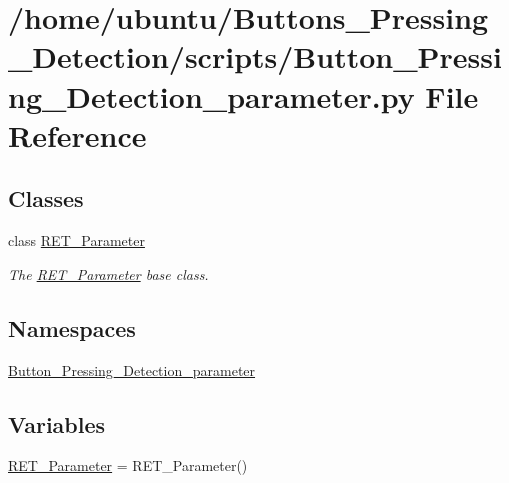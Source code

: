 \hypertarget{a00008}{}\section{/home/ubuntu/\+Buttons\+\_\+\+Pressing\+\_\+\+Detection/scripts/\+Button\+\_\+\+Pressing\+\_\+\+Detection\+\_\+parameter.py File Reference}
\label{a00008}
\subsection*{Classes}
\begin{DoxyCompactItemize}
\item 
class \hyperlink{a00037}{R\+E\+T\+\_\+\+Parameter}
\begin{DoxyCompactList}\small\item\em The \hyperlink{a00037}{R\+E\+T\+\_\+\+Parameter} base class. \end{DoxyCompactList}\end{DoxyCompactItemize}
\subsection*{Namespaces}
\begin{DoxyCompactItemize}
\item 
 \hyperlink{a00022}{Button\+\_\+\+Pressing\+\_\+\+Detection\+\_\+parameter}
\end{DoxyCompactItemize}
\subsection*{Variables}
\begin{DoxyCompactItemize}
\item 
\hyperlink{a00022_a429b502173d8e27264c8a2e0ce50d6d3}{R\+E\+T\+\_\+\+Parameter} = R\+E\+T\+\_\+\+Parameter()
\end{DoxyCompactItemize}
